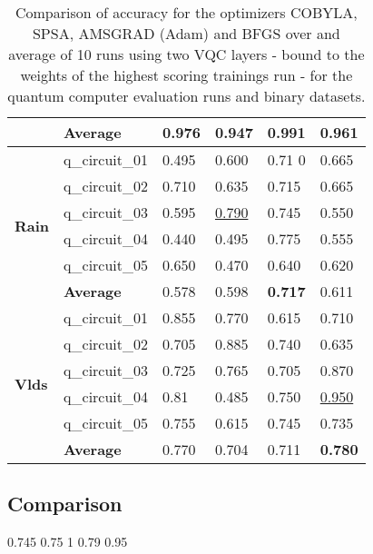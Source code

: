 \begin{table}[!h]
\begin{tabular}{p{}p{}|p{}p{}p{}p{}}
		\cline{2-6} 
		                        & \textbf{Average} & 0.976  & 0.947 & \textbf{0.991}    & 0.961 \\
		\hline 
		\multirow{6}{*}{\textbf{Rain}}   & q\_circuit\_01 & 0.495  & 0.600 & 0.71 0  & 0.665 \\
		                        & q\_circuit\_02 & 0.710  & 0.635 & 0.715    & 0.665 \\
		                        & q\_circuit\_03 & 0.595  & \underline{0.790} & 0.745    & 0.550 \\
		                        & q\_circuit\_04 & 0.440  & 0.495 & 0.775    & 0.555 \\
		                        & q\_circuit\_05 & 0.650  & 0.470 & 0.640   & 0.620 \\
		\cline{2-6} 
		                        & \textbf{Average} & 0.578  & 0.598 & \textbf{0.717}    & 0.611 \\
		\hline 
		\multirow{6}{*}{\textbf{Vlds}}   & q\_circuit\_01 & 0.855  & 0.770 & 0.615    & 0.710 \\
		                        & q\_circuit\_02 & 0.705  & 0.885 & 0.740    & 0.635 \\
		                        & q\_circuit\_03 & 0.725  & 0.765 & 0.705    & 0.870 \\
		                        & q\_circuit\_04 & 0.81  & 0.485 & 0.750    & \underline{0.950} \\
		                        & q\_circuit\_05 & 0.755  & 0.615 & 0.745    & 0.735 \\
		\cline{2-6} 
		                        & \textbf{Average} & 0.770  & 0.704 & 0.711    & \textbf{0.780} \\
		\hline
	\end{tabular}
	\caption{Comparison of accuracy for the optimizers COBYLA, SPSA, AMSGRAD (Adam) and BFGS over and average of 10 runs using two VQC layers - bound to the weights of the highest scoring trainings run - for the quantum computer evaluation runs and binary datasets.}
	\label{table:accuracy_comparison_binary_dataset_and_optimizers_evaluation_runs}
\end{table}

\subsection{Comparison}

0.745
0.75
1
0.79
0.95

